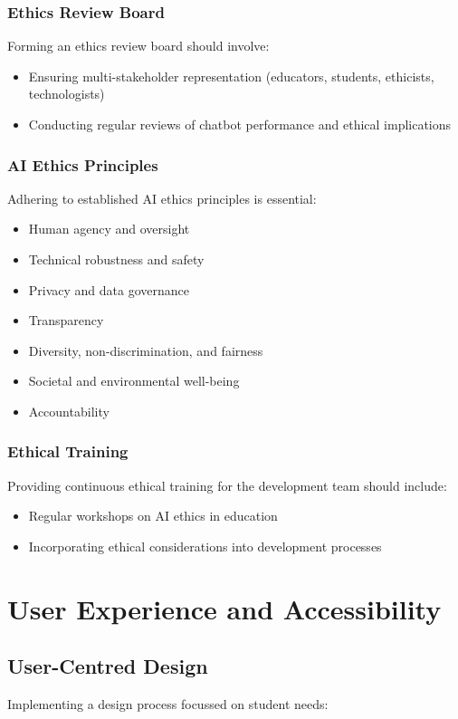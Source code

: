 \documentclass[15pt,a4paper]{article}
\begin{document}
\begin{multicols}{2}
\subsubsection*{Ethics Review Board}
Forming an ethics review board \textit{\parencite{UNESCO2023}} should involve:
\begin{itemize}
    \item Ensuring multi-stakeholder representation (educators, students, ethicists, technologists)
    \item Conducting regular reviews of chatbot performance and ethical implications
\end{itemize}

\subsubsection*{AI Ethics Principles}
Adhering to established AI ethics principles \textit{\parencite{EC2024}} is essential:
\begin{itemize}
    \item Human agency and oversight
    \item Technical robustness and safety
    \item Privacy and data governance
    \item Transparency
    \item Diversity, non-discrimination, and fairness
    \item Societal and environmental well-being
    \item Accountability
\end{itemize}

\subsubsection*{Ethical Training}
Providing continuous ethical training for the development team \textit{\parencite{IEEEEthicsCert2024}} should include:
\begin{itemize}
    \item Regular workshops on AI ethics in education
    \item Incorporating ethical considerations into development processes
\end{itemize}

\section{User Experience and Accessibility}
\subsection{User-Centred Design}
Implementing a design process focussed on student needs:


\end{multicols}
\end{document}
